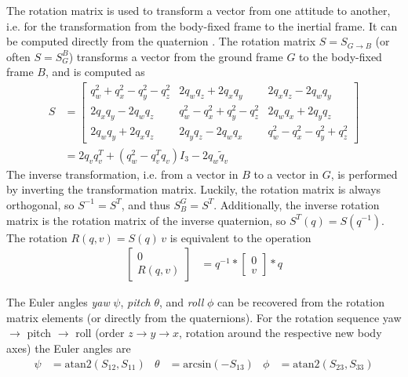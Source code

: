 The rotation matrix is used to transform a vector from one attitude to another, i.e. for the transformation from the body-fixed frame to the inertial frame.
It can be computed directly from the quaternion \cite{zipfel2007, stevens2015}. 
The rotation matrix $S = S_{G \to B}$ (or often $S = S^B_G$) transforms a vector from the ground frame $G$ to the body-fixed frame $B$, and is computed as \cite{stevens2015}
\begin{align}
    S &= \begin{bmatrix}
         q_w^2 + q_x^2 - q_y^2 - q_z^2 & 2 q_w q_z + 2 q_x q_y & 2 q_x q_z - 2 q_w q_y \\
    2 q_x q_y - 2 q_w q_z & q_w^2 - q_x^2 + q_y^2 - q_z^2 & 2 q_w q_x + 2 q_y q_z \\
    2 q_w q_y + 2 q_x q_z & 2 q_y q_z - 2 q_w q_x & q_w^2 - q_x^2 - q_y^2 + q_z^2
    \end{bmatrix} \label{eq:rotationmatrix} \\
    &= 2 q_v q_v^T + (q_w^2-q_v^T q_v) I_3 - 2 q_w \tilde q_v \nonumber
\end{align}
The inverse transformation, i.e. from a vector in $B$ to a vector in $G$, is performed by inverting the transformation matrix. 
Luckily, the rotation matrix is always orthogonal, so $S^{-1} = S^T$, and thus $S^G_B = S^T$. 
Additionally, the inverse rotation matrix is the rotation matrix of the inverse quaternion, so $S^T(q) = S(q^{-1})$.
The rotation $R(q,v) = S(q) \, v$ is equivalent to the operation \cite{stevens2015}
\begin{align}
    \begin{bmatrix}
        0 \\ R(q,v)
    \end{bmatrix} &= q^{-1} * \begin{bmatrix}
        0 \\ v
    \end{bmatrix} *q
\end{align}

The Euler angles \textit{yaw} $\psi$, \textit{pitch} $\theta$, and \textit{roll} $\phi$ can be recovered from the rotation matrix elements (or directly from the quaternions). 
For the rotation sequence yaw $\to$ pitch $\to$ roll (order $z\to y \to x$, rotation around the respective new body axes) the Euler angles are  \cite{stevens2015}
\begin{align}
    \psi &= \mathrm{atan2}(S_{12}, S_{11}) &
    \theta &= \mathrm{arcsin}(-S_{13}) &
    \phi &= \mathrm{atan2}(S_{23}, S_{33}) 
    \label{eq:quaternion2euler}
\end{align}

